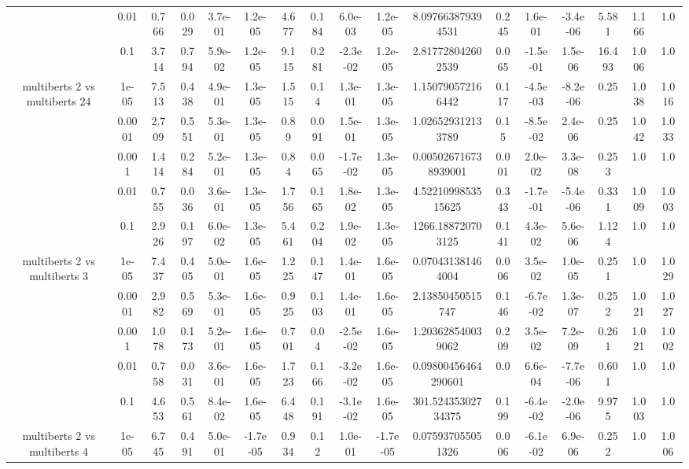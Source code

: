 \begin{tabular}{|c|c|c|c|c|c|c|c|c|c|c|c|c|c|c|c|c|}
 & 0.01 & 0.766 & 0.029 & 3.7e-01 & 1.2e-05 & 4.677 & 0.184 & 6.0e-03 & 1.2e-05 & 8.097663879394531 & 0.245 & 1.6e-01 & -3.4e-06 & 5.581 & 1.166 & 1.0 \\
 & 0.1 & 3.714 & 0.794 & 5.9e-02 & 1.2e-05 & 9.115 & 0.281 & -2.3e-02 & 1.2e-05 & 2.817728042602539 & 0.065 & -1.5e-01 & 1.5e-06 & 16.493 & 1.006 & 1.0 \\
\hline
\multirow{5}{*}{multiberts 2 vs multiberts 24} & 1e-05 & 7.513 & 0.438 & 4.9e-01 & 1.3e-05 & 1.515 & 0.14 & 1.3e-01 & 1.3e-05 & 1.150790572166442 & 0.117 & -4.5e-03 & -8.2e-06 & 0.25 & 1.038 & 1.016 \\
 & 0.0001 & 2.709 & 0.551 & 5.3e-01 & 1.3e-05 & 0.89 & 0.091 & 1.5e-01 & 1.3e-05 & 1.026529312133789 & 0.15 & -8.5e-02 & 2.4e-06 & 0.25 & 1.042 & 1.033 \\
 & 0.001 & 1.414 & 0.284 & 5.2e-01 & 1.3e-05 & 0.84 & 0.065 & -1.7e-02 & 1.3e-05 & 0.005026716738939001 & 0.001 & 2.0e-02 & 3.3e-08 & 0.253 & 1.0 & 1.0 \\
 & 0.01 & 0.755 & 0.036 & 3.6e-01 & 1.3e-05 & 1.756 & 0.165 & 1.8e-02 & 1.3e-05 & 4.5221099853515625 & 0.343 & -1.7e-01 & -5.4e-06 & 0.331 & 1.009 & 1.003 \\
 & 0.1 & 2.926 & 0.197 & 6.0e-02 & 1.3e-05 & 5.461 & 0.204 & 1.9e-02 & 1.3e-05 & 1266.188720703125 & 0.141 & 4.3e-02 & 5.6e-06 & 1.124 & 1.0 & 1.0 \\
\hline
\multirow{5}{*}{multiberts 2 vs multiberts 3} & 1e-05 & 7.437 & 0.405 & 5.0e-01 & 1.6e-05 & 1.225 & 0.147 & 1.4e-01 & 1.6e-05 & 0.070431381464004 & 0.006 & 3.5e-02 & 1.0e-05 & 0.251 & 1.0 & 1.029 \\
 & 0.0001 & 2.982 & 0.569 & 5.3e-01 & 1.6e-05 & 0.925 & 0.103 & 1.4e-01 & 1.6e-05 & 2.13850450515747 & 0.146 & -6.7e-02 & 1.3e-07 & 0.252 & 1.021 & 1.027 \\
 & 0.001 & 1.078 & 0.173 & 5.2e-01 & 1.6e-05 & 0.701 & 0.04 & -2.5e-02 & 1.6e-05 & 1.203628540039062 & 0.209 & 3.5e-02 & 7.2e-09 & 0.261 & 1.021 & 1.002 \\
 & 0.01 & 0.758 & 0.031 & 3.6e-01 & 1.6e-05 & 1.723 & 0.166 & -3.2e-02 & 1.6e-05 & 0.09800456464290601 & 0.0 & 6.6e-04 & -7.7e-06 & 0.601 & 1.0 & 1.0 \\
 & 0.1 & 4.653 & 0.561 & 8.4e-02 & 1.6e-05 & 6.448 & 0.191 & -3.1e-02 & 1.6e-05 & 301.52435302734375 & 0.199 & -6.4e-02 & -2.0e-06 & 9.975 & 1.003 & 1.0 \\
\hline
\multirow{5}{*}{multiberts 2 vs multiberts 4} & 1e-05 & 6.745 & 0.491 & 5.0e-01 & -1.7e-05 & 0.934 & 0.12 & 1.0e-01 & -1.7e-05 & 0.075937055051326 & 0.006 & -6.1e-02 & 6.9e-06 & 0.252 & 1.0 & 1.006 \\

\end{tabular}
